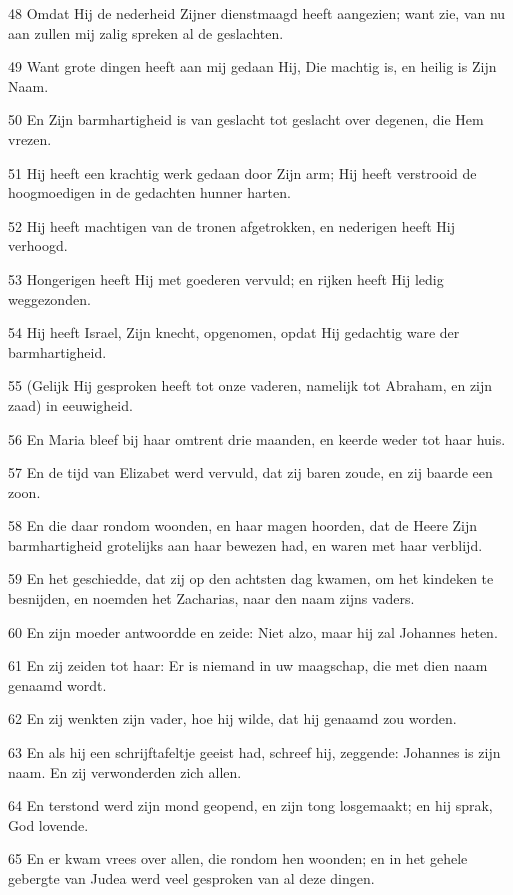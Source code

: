 \par 48 Omdat Hij de nederheid Zijner dienstmaagd heeft aangezien; want zie, van nu aan zullen mij zalig spreken al de geslachten.
\par 49 Want grote dingen heeft aan mij gedaan Hij, Die machtig is, en heilig is Zijn Naam.
\par 50 En Zijn barmhartigheid is van geslacht tot geslacht over degenen, die Hem vrezen.
\par 51 Hij heeft een krachtig werk gedaan door Zijn arm; Hij heeft verstrooid de hoogmoedigen in de gedachten hunner harten.
\par 52 Hij heeft machtigen van de tronen afgetrokken, en nederigen heeft Hij verhoogd.
\par 53 Hongerigen heeft Hij met goederen vervuld; en rijken heeft Hij ledig weggezonden.
\par 54 Hij heeft Israel, Zijn knecht, opgenomen, opdat Hij gedachtig ware der barmhartigheid.
\par 55 (Gelijk Hij gesproken heeft tot onze vaderen, namelijk tot Abraham, en zijn zaad) in eeuwigheid.
\par 56 En Maria bleef bij haar omtrent drie maanden, en keerde weder tot haar huis.
\par 57 En de tijd van Elizabet werd vervuld, dat zij baren zoude, en zij baarde een zoon.
\par 58 En die daar rondom woonden, en haar magen hoorden, dat de Heere Zijn barmhartigheid grotelijks aan haar bewezen had, en waren met haar verblijd.
\par 59 En het geschiedde, dat zij op den achtsten dag kwamen, om het kindeken te besnijden, en noemden het Zacharias, naar den naam zijns vaders.
\par 60 En zijn moeder antwoordde en zeide: Niet alzo, maar hij zal Johannes heten.
\par 61 En zij zeiden tot haar: Er is niemand in uw maagschap, die met dien naam genaamd wordt.
\par 62 En zij wenkten zijn vader, hoe hij wilde, dat hij genaamd zou worden.
\par 63 En als hij een schrijftafeltje geeist had, schreef hij, zeggende: Johannes is zijn naam. En zij verwonderden zich allen.
\par 64 En terstond werd zijn mond geopend, en zijn tong losgemaakt; en hij sprak, God lovende.
\par 65 En er kwam vrees over allen, die rondom hen woonden; en in het gehele gebergte van Judea werd veel gesproken van al deze dingen.
